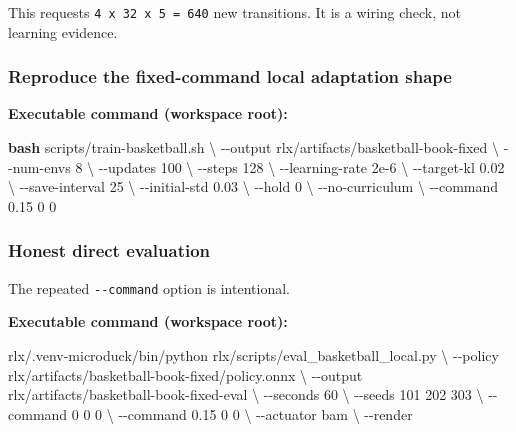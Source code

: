 \documentclass[
  american,
  11pt,
  letterpaper,
]{article}
\newenvironment{Shaded}{\begin{snugshade}}{\end{snugshade}}
\newcommand{\AttributeTok}[1]{\textcolor[rgb]{0.13,0.29,0.53}{#1}}
\newcommand{\DataTypeTok}[1]{\textcolor[rgb]{0.13,0.29,0.53}{#1}}
\newcommand{\ExtensionTok}[1]{#1}
\newcommand{\FunctionTok}[1]{\textcolor[rgb]{0.13,0.29,0.53}{\textbf{#1}}}
\newcommand{\NormalTok}[1]{#1}
\renewenvironment{Shaded}{\par\smallskip}{\par\smallskip}
\begin{document}
This requests \texttt{4\ x\ 32\ x\ 5\ =\ 640} new transitions. It is a
wiring check, not learning evidence.

\subsubsection{Reproduce the fixed-command local adaptation
shape}\label{reproduce-the-fixed-command-local-adaptation-shape}

\textbf{Executable command (workspace root):}

\begin{Shaded}
\begin{Highlighting}[]
\FunctionTok{bash}\NormalTok{ scripts/train{-}basketball.sh }\DataTypeTok{\textbackslash{}}
  \AttributeTok{{-}{-}output}\NormalTok{ rlx/artifacts/basketball{-}book{-}fixed }\DataTypeTok{\textbackslash{}}
  \AttributeTok{{-}{-}num{-}envs}\NormalTok{ 8 }\DataTypeTok{\textbackslash{}}
  \AttributeTok{{-}{-}updates}\NormalTok{ 100 }\DataTypeTok{\textbackslash{}}
  \AttributeTok{{-}{-}steps}\NormalTok{ 128 }\DataTypeTok{\textbackslash{}}
  \AttributeTok{{-}{-}learning{-}rate}\NormalTok{ 2e{-}6 }\DataTypeTok{\textbackslash{}}
  \AttributeTok{{-}{-}target{-}kl}\NormalTok{ 0.02 }\DataTypeTok{\textbackslash{}}
  \AttributeTok{{-}{-}save{-}interval}\NormalTok{ 25 }\DataTypeTok{\textbackslash{}}
  \AttributeTok{{-}{-}initial{-}std}\NormalTok{ 0.03 }\DataTypeTok{\textbackslash{}}
  \AttributeTok{{-}{-}hold}\NormalTok{ 0 }\DataTypeTok{\textbackslash{}}
  \AttributeTok{{-}{-}no{-}curriculum} \DataTypeTok{\textbackslash{}}
  \AttributeTok{{-}{-}command}\NormalTok{ 0.15 0 0}
\end{Highlighting}
\end{Shaded}

\subsubsection{Honest direct evaluation}\label{honest-direct-evaluation}

The repeated \texttt{-\/-command} option is intentional.

\textbf{Executable command (workspace root):}

\begin{Shaded}
\begin{Highlighting}[]
\ExtensionTok{rlx/.venv{-}microduck/bin/python}\NormalTok{ rlx/scripts/eval\_basketball\_local.py }\DataTypeTok{\textbackslash{}}
  \AttributeTok{{-}{-}policy}\NormalTok{ rlx/artifacts/basketball{-}book{-}fixed/policy.onnx }\DataTypeTok{\textbackslash{}}
  \AttributeTok{{-}{-}output}\NormalTok{ rlx/artifacts/basketball{-}book{-}fixed{-}eval }\DataTypeTok{\textbackslash{}}
  \AttributeTok{{-}{-}seconds}\NormalTok{ 60 }\DataTypeTok{\textbackslash{}}
  \AttributeTok{{-}{-}seeds}\NormalTok{ 101 202 303 }\DataTypeTok{\textbackslash{}}
  \AttributeTok{{-}{-}command}\NormalTok{ 0 0 0 }\DataTypeTok{\textbackslash{}}
  \AttributeTok{{-}{-}command}\NormalTok{ 0.15 0 0 }\DataTypeTok{\textbackslash{}}
  \AttributeTok{{-}{-}actuator}\NormalTok{ bam }\DataTypeTok{\textbackslash{}}
  \AttributeTok{{-}{-}render}
\end{Highlighting}
\end{Shaded}
\end{document}
